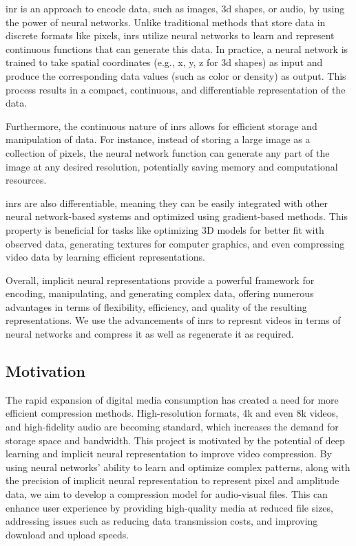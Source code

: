\documentclass{ioereport}
\begin{document}
    \gls{inr} is an  approach to encode data, such as images, \gls{3d} shapes, or audio, by using the power of neural networks. Unlike traditional methods that store data in discrete formats like pixels, \gls{inr}s utilize neural networks to learn and represent continuous functions that can generate this data. In practice, a neural network is trained to take spatial coordinates (e.g., x, y, z for \gls{3d} shapes) as input and produce the corresponding data values (such as color or density) as output. This process results in a compact, continuous, and differentiable representation of the data.
    
    Furthermore, the continuous nature of \gls{inr}s allows for efficient storage and manipulation of data. For instance, instead of storing a large image as a collection of pixels, the neural network function can generate any part of the image at any desired resolution, potentially saving memory and computational resources.
    
    \gls{inr}s are also differentiable, meaning they can be easily integrated with other neural network-based systems and optimized using gradient-based methods. This property is beneficial for tasks like optimizing 3D models for better fit with observed data, generating textures for computer graphics, and even compressing video data by learning efficient representations.
    
    Overall, implicit neural representations provide a powerful framework for encoding, manipulating, and generating complex data, offering numerous advantages in terms of flexibility, efficiency, and quality of the resulting representations.
    We use the advancements of \gls{inr}s to represnt videos in terms of neural networks and compress it as well as regenerate it as required.
    
    \subsection{Motivation}
    The rapid expansion of digital media consumption has created a need for more efficient compression methods. High-resolution formats, 4k and even 8k videos, and high-fidelity audio are becoming standard, which increases the demand for storage space and bandwidth. This project is motivated by the potential of deep learning and implicit neural representation to improve video compression. By using neural networks' ability to learn and optimize complex patterns, along with the precision of implicit neural representation to represent pixel and amplitude data, we aim to develop a compression model for audio-visual files. This can enhance user experience by providing high-quality media at reduced file sizes, addressing issues such as reducing data transmission costs, and improving download and upload speeds.
    
\end{document}
